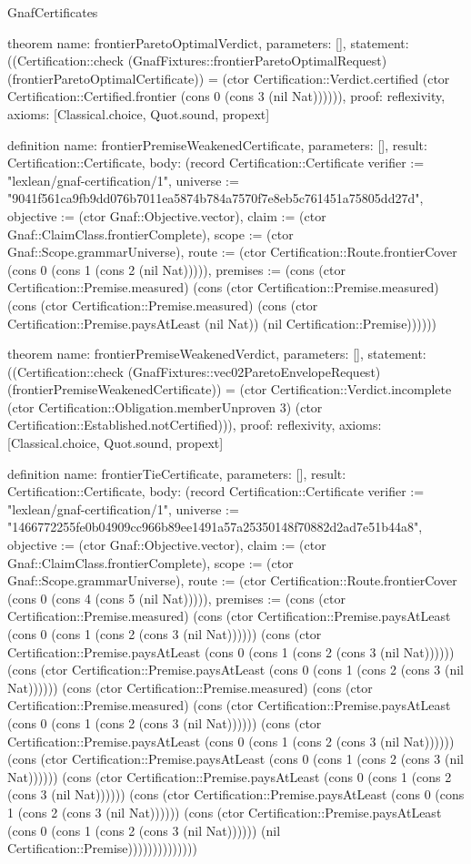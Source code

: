 \begin{lexlean}{GnafCertificates}
\begin{semanticmodule}
theorem{
  name: frontierParetoOptimalVerdict,
  parameters: [],
  statement: ((Certification::check (GnafFixtures::frontierParetoOptimalRequest) (frontierParetoOptimalCertificate)) = (ctor Certification::Verdict.certified (ctor Certification::Certified.frontier (cons 0 (cons 3 (nil Nat)))))),
  proof: reflexivity{},
  axioms: [Classical.choice, Quot.sound, propext]
}

definition{
  name: frontierPremiseWeakenedCertificate,
  parameters: [],
  result: Certification::Certificate,
  body: (record Certification::Certificate {verifier := "lexlean/gnaf-certification/1", universe := "9041f561ca9fb9dd076b7011ea5874b784a7570f7e8eb5c761451a75805dd27d", objective := (ctor Gnaf::Objective.vector), claim := (ctor Gnaf::ClaimClass.frontierComplete), scope := (ctor Gnaf::Scope.grammarUniverse), route := (ctor Certification::Route.frontierCover (cons 0 (cons 1 (cons 2 (nil Nat))))), premises := (cons (ctor Certification::Premise.measured) (cons (ctor Certification::Premise.measured) (cons (ctor Certification::Premise.measured) (cons (ctor Certification::Premise.paysAtLeast (nil Nat)) (nil Certification::Premise)))))})
}

theorem{
  name: frontierPremiseWeakenedVerdict,
  parameters: [],
  statement: ((Certification::check (GnafFixtures::vec02ParetoEnvelopeRequest) (frontierPremiseWeakenedCertificate)) = (ctor Certification::Verdict.incomplete (ctor Certification::Obligation.memberUnproven 3) (ctor Certification::Established.notCertified))),
  proof: reflexivity{},
  axioms: [Classical.choice, Quot.sound, propext]
}

definition{
  name: frontierTieCertificate,
  parameters: [],
  result: Certification::Certificate,
  body: (record Certification::Certificate {verifier := "lexlean/gnaf-certification/1", universe := "1466772255fe0b04909cc966b89ee1491a57a25350148f70882d2ad7e51b44a8", objective := (ctor Gnaf::Objective.vector), claim := (ctor Gnaf::ClaimClass.frontierComplete), scope := (ctor Gnaf::Scope.grammarUniverse), route := (ctor Certification::Route.frontierCover (cons 0 (cons 4 (cons 5 (nil Nat))))), premises := (cons (ctor Certification::Premise.measured) (cons (ctor Certification::Premise.paysAtLeast (cons 0 (cons 1 (cons 2 (cons 3 (nil Nat)))))) (cons (ctor Certification::Premise.paysAtLeast (cons 0 (cons 1 (cons 2 (cons 3 (nil Nat)))))) (cons (ctor Certification::Premise.paysAtLeast (cons 0 (cons 1 (cons 2 (cons 3 (nil Nat)))))) (cons (ctor Certification::Premise.measured) (cons (ctor Certification::Premise.measured) (cons (ctor Certification::Premise.paysAtLeast (cons 0 (cons 1 (cons 2 (cons 3 (nil Nat)))))) (cons (ctor Certification::Premise.paysAtLeast (cons 0 (cons 1 (cons 2 (cons 3 (nil Nat)))))) (cons (ctor Certification::Premise.paysAtLeast (cons 0 (cons 1 (cons 2 (cons 3 (nil Nat)))))) (cons (ctor Certification::Premise.paysAtLeast (cons 0 (cons 1 (cons 2 (cons 3 (nil Nat)))))) (cons (ctor Certification::Premise.paysAtLeast (cons 0 (cons 1 (cons 2 (cons 3 (nil Nat)))))) (cons (ctor Certification::Premise.paysAtLeast (cons 0 (cons 1 (cons 2 (cons 3 (nil Nat)))))) (nil Certification::Premise)))))))))))))})
}


\end{semanticmodule}
\end{lexlean}
